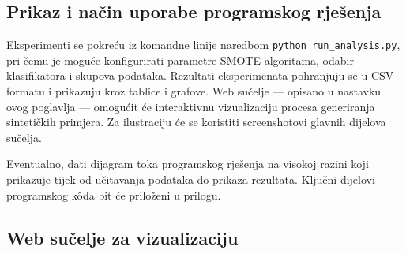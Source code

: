 \subsection{Prikaz i na\v{c}in uporabe programskog rje\v{s}enja}

Eksperimenti se pokre\'{c}u iz komandne linije naredbom
\texttt{python run\_analysis.py}, pri \v{c}emu je mogu\'{c}e konfigurirati
parametre SMOTE algoritama, odabir klasifikatora i skupova podataka.
Rezultati eksperimenata pohranjuju se u CSV formatu i prikazuju kroz
tablice i grafove. Web su\v{c}elje --- opisano u nastavku ovog poglavlja --- omogu\'{c}it
\'{c}e interaktivnu vizualizaciju procesa generiranja sinteti\v{c}kih
primjera. Za ilustraciju \'{c}e se koristiti screenshotovi glavnih
dijelova su\v{c}elja.

Eventualno, dati dijagram toka programskog rje\v{s}enja na visokoj razini
koji prikazuje tijek od u\v{c}itavanja podataka do prikaza rezultata.
Klju\v{c}ni dijelovi programskog k\^{o}da bit \'{c}e prilo\v{z}eni u
prilogu.

\subsection{Web su\v{c}elje za vizualizaciju}


